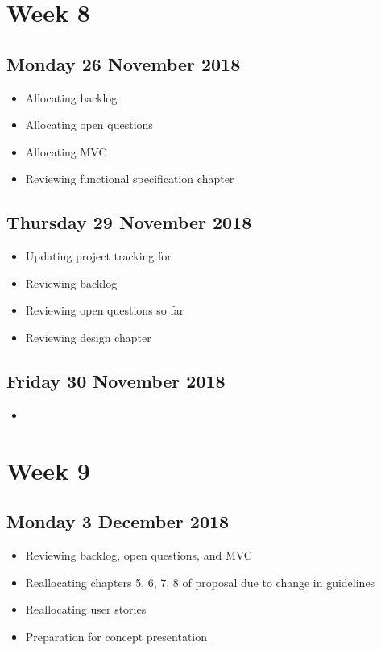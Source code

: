\section*{Week 8}
\subsection*{Monday 26 November 2018}
\begin{itemize}
	\item Allocating backlog
	\item Allocating open questions
	\item Allocating MVC
	\item Reviewing functional specification chapter
\end{itemize}

\subsection*{Thursday 29 November 2018}
\begin{itemize}
	\item Updating project tracking for
	\item Reviewing backlog
	\item Reviewing open questions so far
	\item Reviewing design chapter
\end{itemize}

\subsection*{Friday 30 November 2018}
\begin{itemize}
	\item 
\end{itemize}

\section*{Week 9}
\subsection*{Monday 3 December 2018}
\begin{itemize}
	\item Reviewing backlog, open questions, and MVC
	\item Reallocating chapters 5, 6, 7, 8 of proposal due to change in guidelines
	\item Reallocating user stories
	\item Preparation for concept presentation
\end{itemize}

